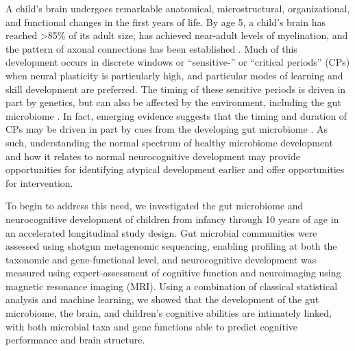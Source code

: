 A child's brain undergoes remarkable anatomical, microstructural,
organizational, and functional changes in the first years of life. By
age 5, a child's brain has reached \textgreater85\% of its adult size,
has achieved near-adult levels of myelination, and the pattern of axonal
connections has been established
\cite{silbereisCellularMolecularLandscapes2016}.
Much of this development occurs in discrete windows or
``sensitive-'' or ``critical periods'' (CPs)
\cite{knudsenSensitivePeriodsDevelopment2004}
when neural plasticity is particularly high,
and particular modes of learning
and skill development are preferred. The timing of these sensitive
periods is driven in part by genetics, but can also be affected by the
environment, including the gut microbiome
\cite{cowanAnnualResearchReview2020}.
In fact, emerging evidence suggests that the timing and duration of CPs
may be driven in part by cues from the developing gut microbiome
\cite{callaghanNestedSensitivePeriods2020}.
As such,
understanding the normal spectrum of healthy microbiome
development and how it relates to normal neurocognitive development may
provide opportunities for identifying atypical development earlier and
offer opportunities for intervention.

To begin to address this need, we investigated the gut microbiome and
neurocognitive development of children from infancy through 10 years of
age in an accelerated longitudinal study design. Gut microbial
communities were assessed using shotgun metagenomic sequencing, enabling
profiling at both the taxonomic and gene-functional level, and
neurocognitive development was measured using expert-assessment of
cognitive function and neuroimaging using magnetic resonance imaging
(MRI). Using a combination of classical statistical analysis and machine
learning, we showed that the development of the gut microbiome, the
brain, and children's cognitive abilities are intimately linked, with
both microbial taxa and gene functions able to predict cognitive
performance and brain structure.
